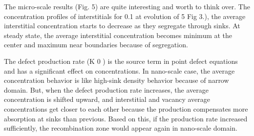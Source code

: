 \documentclass[a4paper]{article}
\begin{document}
The micro-scale results (Fig. 5) are quite interesting and worth to think over. The
concentration profiles of interstitials for 0.1%
at evolution of 5%
Fig 3.), the average interstitial concentration starts to decrease as they segregate through sinks.
At steady state, the average interstitial concentration becomes minimum at the center and
maximum near boundaries because of segregation.

The defect production rate (K 0 ) is the source term in point defect equations and has a
significant effect on concentrations.
In nano-scale case, the average concentration behavior is like high-sink density behavior
because of narrow domain. But, when the defect production rate increases, the average
concentration is shifted upward, and interstitial and vacancy average concentrations get closer
to each other because the production compensates more absorption at sinks than previous.
Based on this, if the production rate increased sufficiently, the recombination zone would
appear again in nano-scale domain.
\end{document}
